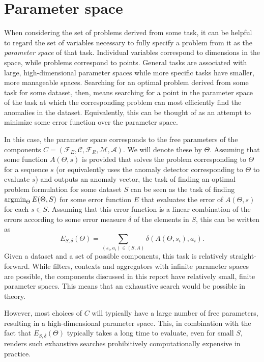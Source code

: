 \section{Parameter space}

When considering the set of problems derived from some task, it can be helpful to regard the set of variables necessary to fully specify a problem from it as the \emph{parameter space} of that task. Individual variables correspond to dimensions in the space, while problems correspond to points. General tasks are associated with large, high-dimensional parameter spaces while more specific tasks have smaller, more manageable spaces.  Searching for an optimal problem derived from some task for some dataset, then, means searching for a point in the parameter space of the task at which the corresponding problem can most efficiently find the anomalies in the dataset. Equivalently, this can be thought of as an attempt to minimize some error function over the parameter space. 

In this case, the parameter space corresponds to the free parameters of the components $C = (\mathcal{F}_E, \mathcal{C}, \mathcal{F}_R, \mathcal{M},\mathcal{A})$. We will denote these by $\Theta$. Assuming that some function $A(\Theta, s)$ is provided that solves the problem corresponding to $\Theta$ for a sequence $s$ (or equivalently uses the anomaly detector corresponding to $\Theta$ to evaluate $s$) and outputs an anomaly vector, the task of finding an optimal problem formulation for some dataset $S$ can be seen as the task of finding $\argmin_\Theta E(\Theta, S)$ for some error function $E$ that evaluates the error of $A(\Theta, s)$ for each $s \in S$. Assuming that this error function is a linear combination of the errors according to some error measure $\delta$ of the elements in $S$, this can be written as
\[
    E_{S, \delta}(\Theta) = \sum_{(s_i, a_i) \in (S, A)} \delta(A(\Theta, s_i), a_i).
\]
Given a dataset and a set of possible components, this task is relatively straight-forward. While filters, contexts and aggregators with infinite parameter spaces are possible, the components discussed in this report have relatively small, finite parameter spaces. This means that an exhaustive search would be possible in theory.

However, most choices of $C$ will typically have a large number of free parameters, resulting in a high-dimensional parameter space. This, in combination with the fact that $E_{S, \delta}(\Theta)$ typically takes a long time to evaluate, even for small $S$, renders such exhaustive searches prohibitively computationally expensive in practice.

